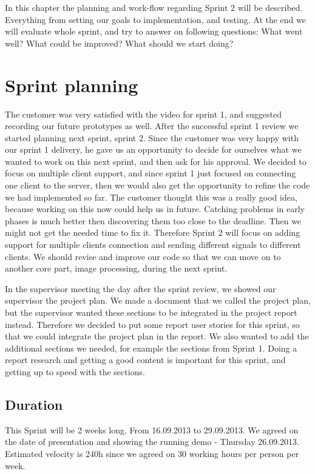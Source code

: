 In this chapter the planning and work-flow regarding Sprint 2 will be described. 
Everything from setting our goals to implementation, and testing. At the end we will evaluate whole sprint, and try to answer on following questions: What went well? What could be improved? What should we start doing? 

\section{Sprint planning}
The customer was very satisfied with the video for sprint 1, and suggested recording our future prototypes as well. 
After the successful sprint 1 review we started planning next sprint, sprint 2. Since the customer was very happy with our sprint 1 delivery, he gave us an opportunity to decide for ourselves what we wanted to work on this next sprint, and then ask for his approval. 
We decided to focus on multiple client support, and since sprint 1 just focused on connecting one client to the server, then we would also get the opportunity to refine the code we had implemented so far. The customer thought this was a really good idea, because working on this now could help us in future. Catching problems in early phases is much better then discovering them too close to the deadline. Then we might not get the needed time to fix it. Therefore Sprint 2 will focus on adding support for multiple clients connection and sending different signals to different clients. We should revise and improve our code so that we can move on to another core part, image processing, during the next sprint.


In the supervisor meeting the day after the sprint review, we showed our supervisor the project plan. 
We made a document that we called the project plan, but the supervisor wanted these sections to be integrated in the project report instead. Therefore we decided to put some report user stories for this sprint, so that we could integrate the project plan in the report. We also wanted to add the additional sections we needed, for example the sections from Sprint 1. 
Doing a report research and getting a good content is important for this sprint, and getting up to speed with the sections. 

\subsection{Duration}
This Sprint will be 2 weeks long. From 16.09.2013 to 29.09.2013.
We agreed on the date of presentation and showing the running demo - Thursday 26.09.2013.
Estimated velocity is 240h since we agreed on 30 working hours per person per week.

